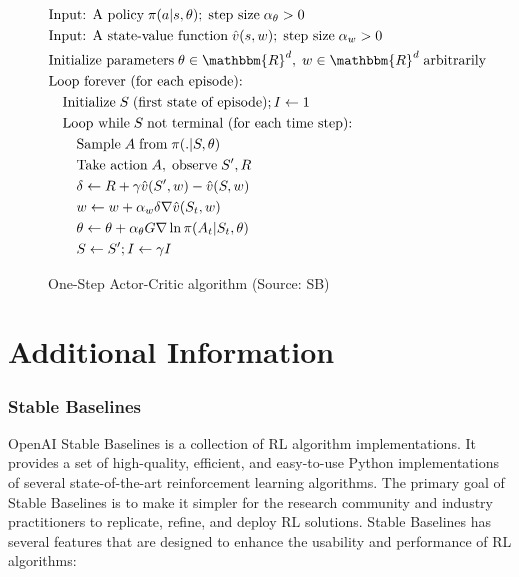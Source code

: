 \begin{figure}
\small
\begin{tcolorbox}[colback=code]
\vspace{-\baselineskip}
\vspace{-.5\baselineskip}
\begin{align*}
& \text{Input: A policy}\;\pi(a | s, \theta);\;\text{step size}\; \alpha_\theta > 0 \\
& \text{Input: A state-value function}\;\hat{v}(s, w);\;\text{step size}\; \alpha_w > 0 \hspace{1in} \\
& \text{Initialize parameters}\; \theta \in \mathbbm{R}^d,\; w \in \mathbbm{R}^d\;\text{arbitrarily} \\
& \text{Loop forever (for each episode):} \\
& \quad \text{Initialize}\;S\;\text{(first state of episode)}; I \leftarrow 1 \\
& \quad \text{Loop while}\;S\;\text{not terminal (for each time step):} \\
& \quad \quad \text{Sample}\;A\;\text{from}\; \pi(.|S, \theta) \\
& \quad \quad \text{Take action}\;A,\;\text{observe}\;S', R \\
& \quad \quad \delta \leftarrow R + \gamma \hat{v}(S', w) - \hat{v}(S, w) \\
& \quad \quad w \leftarrow w + \alpha_w \delta \nabla \hat{v}(S_t, w) \\
& \quad \quad \theta \leftarrow \theta + \alpha_\theta G \nabla \ln \pi(A_t | S_t, \theta) \\
& \quad \quad S \leftarrow S'; I \leftarrow \gamma I
\end{align*}
\end{tcolorbox}
\caption[One-Step Actor-Critic algorithm]{One-Step Actor-Critic algorithm (Source: SB)}
\label{fig:actorcritic}
\end{figure}

\section{Additional Information}

\subsubsection*{Stable Baselines}

OpenAI Stable Baselines is a collection of RL algorithm implementations. It provides a set of high-quality, efficient, and easy-to-use Python implementations of several state-of-the-art reinforcement learning algorithms. The primary goal of Stable Baselines is to make it simpler for the research community and industry practitioners to replicate, refine, and deploy RL solutions. Stable Baselines has several features that are designed to enhance the usability and performance of RL algorithms:

